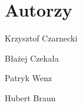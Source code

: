 \section{Autorzy}
\begin{center}
   \large
{Krzysztof Czarnecki

Błażej Czekała


Patryk Wenz

Hubert Braun} 
\end{center}